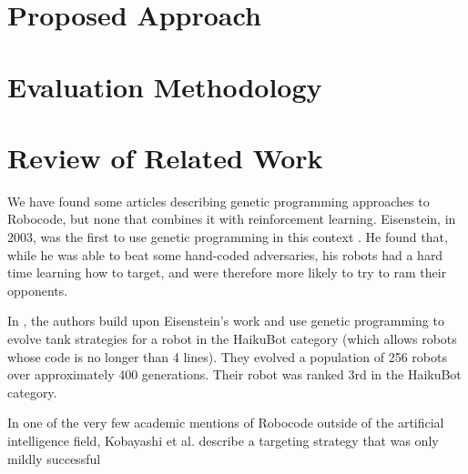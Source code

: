 \documentclass{article}
\theoremstyle{plain}
\theoremstyle{definition}
\theoremstyle{remark}
\begin{document}
\section*{Proposed Approach}

\section*{Evaluation Methodology}

\section*{Review of Related Work}
We have found some articles describing genetic programming
approaches to Robocode, but none that combines it with reinforcement
learning. Eisenstein, in 2003, was the first to use genetic programming
in this context \cite{gp2}. He found that,
while he was able to beat some hand-coded adversaries, his robots
had a hard time learning how to target, and were therefore more
likely to try to ram their opponents.

In \cite{gp1}, the authors build upon Eisenstein's work and use genetic programming to evolve tank
strategies for a robot in the HaikuBot category (which allows
robots whose code is no longer than 4 lines). They evolved a population
of 256 robots over approximately 400 generations. Their robot was ranked
3rd in the HaikuBot category.

In one of the very few academic mentions of Robocode outside of the artificial
intelligence field, Kobayashi et al. describe a targeting strategy that was
only mildly successful \cite{strategies}


\end{document}
